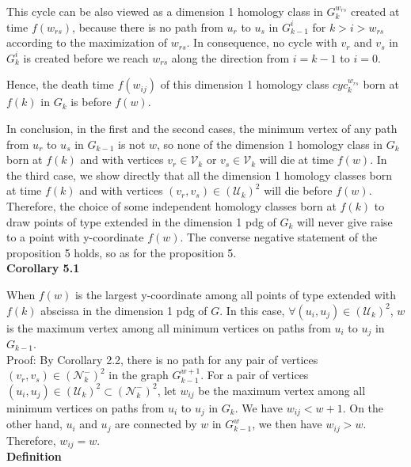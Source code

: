 \documentclass[a4paper,12pt]{article}
\numberwithin{equation}{section}
\begin{document}
\begin{itemize}
			This cycle can be also viewed as a dimension 1 homology class in $G_k^{w_{rs}}$ created at time $f(w_{rs})$, because there is no path from $u_r$ to $u_s$ in $G^{i}_{k-1}$ for $k > i > w_{rs}$ according to the maximization of $w_{rs}$. In consequence, no cycle with $v_r$ and $v_s$ in $G^{i}_k$ is created before we reach $w_{rs}$ along the direction from $i = k-1$ to $ i= 0$. 
			
			Hence, the death time $f(w_{ij})$ of this dimension 1 homology class $cyc_k^{w_{rs}}$ born at $f(k)$ in $G_{k}$ is before $f(w)$.     
	    \end{itemize}
	    
	  In conclusion, in the first and the second cases, the minimum vertex of any path from $u_r$ to $u_s$ in $G_{k-1}$ is not $w$, so none of the dimension 1 homology class in $G_k$ born at $f(k)$ and with vertices $v_r \in \mathcal{V}_k$ or $v_s \in \mathcal{V}_k$ will die at time $f(w)$. In the third case, we show directly that all the dimension 1 homology classes born at time $f(k)$ and with vertices $(v_r,v_s) \in (\mathcal{U}_k)^2$ will die before $f(w)$. Therefore, the choice of some independent homology classes born at $f(k)$ to draw points of type extended in the dimension 1 pdg of $G_k$ will never give raise to a point with y-coordinate $f(w)$. The converse negative statement of the proposition 5 holds, so as for the proposition 5.\\

	\noindent \textbf{Corollary 5.1}
	
	When $f(w)$ is the largest y-coordinate among all points of type extended with $f(k)$ abscissa in the dimension 1 pdg of $G$. In this case, $\forall (u_i,u_j) \in (\mathcal{U}_k)^2$, $w$ is the maximum vertex among all minimum vertices on paths from $u_i$ to $u_j$ in $G_{k-1}$.\\
	
	\noindent Proof:
	By Corollary 2.2, there is no path for any pair of vertices $(v_r,v_s) \in (\mathcal{N}_k^-)^2$ in the graph $G^{w+1}_{k-1}$. 
	For a pair of vertices $(u_i,u_j) \in (\mathcal{U}_k)^2 \subset (\mathcal{N}_k^-)^2$, let $w_{ij}$ be the maximum vertex among all minimum vertices on paths from $u_i$ to $u_j$ in $G_k$. We have $w_{ij} < w+1$. On the other hand, $u_i$ and $u_j$ are connected by $w$ in $G^w_{k-1}$, we then have $w_{ij} > w$. Therefore, $w_{ij} = w$.\\
	
	\noindent \textbf{Definition}
	
\end{document}
